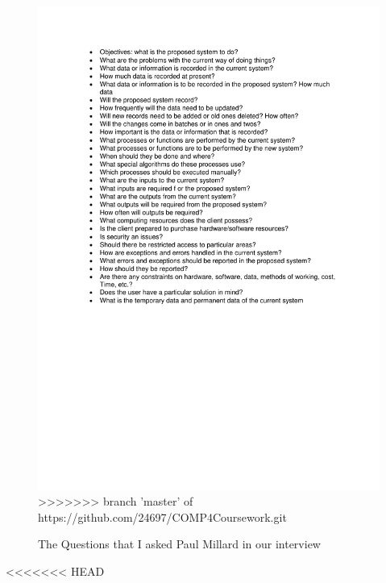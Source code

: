 \begin{figure}[H]
    \includegraphics[width=\textwidth]{./TeamCambridgeSpec/Questions.pdf}
>>>>>>> branch 'master' of https://github.com/24697/COMP4Coursework.git
    \caption{The Questions that I asked Paul Millard in our interview} \label{fig:Questions}
\end{figure}

<<<<<<< HEAD


